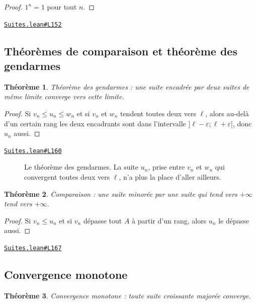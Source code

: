 \documentclass[11pt,a4paper]{article}
\theoremstyle{definition}
\theoremstyle{plain}
\newtheorem{theoreme}{Théorème}
\newcommand{\source}[2]{\par\smallskip\noindent\hfill{\footnotesize\href{#1}{\texttt{#2}}}\par\smallskip}
\begin{document}
\begin{proof}
$1^n = 1$ pour tout $n$.
\end{proof}
\source{https://github.com/Commutator-IO/learn-lean/blob/main/courses/02-lycee/03-suites/Suites.lean\#L152}{Suites.lean\#L152}

\subsection{Théorèmes de comparaison et théorème des gendarmes}

\begin{theoreme}
Théorème des gendarmes : une suite encadrée par deux suites de même limite converge
vers cette limite.
\end{theoreme}

\begin{proof}
Si $v_n \le u_n \le w_n$ et si $v_n$ et $w_n$ tendent toutes deux vers $\ell$, alors
au-delà d'un certain rang les deux encadrants sont dans l'intervalle
$]\ell - \varepsilon ; \ell + \varepsilon[$, donc $u_n$ aussi.
\end{proof}
\source{https://github.com/Commutator-IO/learn-lean/blob/main/courses/02-lycee/03-suites/Suites.lean\#L160}{Suites.lean\#L160}

\begin{figure}[h]
\centering

\caption{Le théorème des gendarmes. La suite $u_n$, prise entre $v_n$ et $w_n$ qui convergent toutes deux vers $\ell$, n'a plus la place d'aller ailleurs.}
\end{figure}

\begin{theoreme}
Comparaison : une suite minorée par une suite qui tend vers $+\infty$ tend vers
$+\infty$.
\end{theoreme}

\begin{proof}
Si $v_n \le u_n$ et si $v_n$ dépasse tout $A$ à partir d'un rang, alors $u_n$ le dépasse
aussi.
\end{proof}
\source{https://github.com/Commutator-IO/learn-lean/blob/main/courses/02-lycee/03-suites/Suites.lean\#L167}{Suites.lean\#L167}

\subsection{Convergence monotone}

\begin{theoreme}
Convergence monotone : toute suite croissante majorée converge.
\end{theoreme}
\end{document}
